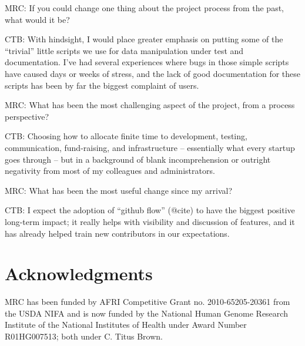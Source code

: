 \documentclass[11pt]{article}
\begin{document}
MRC: If you could change one thing about the project process from the
past, what would it be?

CTB: With hindsight, I would place greater emphasis on putting some of
the ``trivial'' little scripts we use for data manipulation under test
and documentation.  I've had several experiences where bugs in those
simple scripts have caused days or weeks of stress, and the lack of
good documentation for these scripts has been by far the biggest
complaint of users.

MRC: What has been the most challenging aspect of the project, from a
process perspective?

CTB: Choosing how to allocate finite time to development, testing,
communication, fund-raising, and infrastructure -- essentially what
every startup goes through -- but in a background of blank
incomprehension or outright negativity from most of my colleagues
and administrators.

MRC: What has been the most useful change since my arrival?

CTB: I expect the adoption of ``github flow'' (@cite) to have the biggest
positive long-term impact; it really helps with visibility and discussion
of features, and it has already helped train new contributors in our
expectations.




\section*{Acknowledgments}

MRC has been funded by AFRI Competitive Grant no. 2010-65205-20361
from the USDA NIFA and is now funded by the National Human Genome
Research Institute of the National Institutes of Health under Award
Number R01HG007513; both under C. Titus Brown.




%




\end{document}
